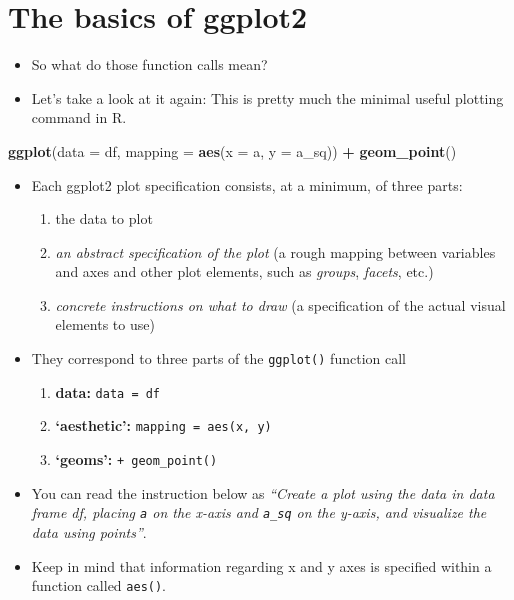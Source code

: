 \documentclass[
]{book}
\newenvironment{Shaded}{\begin{snugshade}}{\end{snugshade}}
\newcommand{\AttributeTok}[1]{\textcolor[rgb]{0.13,0.29,0.53}{#1}}
\newcommand{\FunctionTok}[1]{\textcolor[rgb]{0.13,0.29,0.53}{\textbf{#1}}}
\newcommand{\NormalTok}[1]{#1}
\newcommand{\SpecialCharTok}[1]{\textcolor[rgb]{0.81,0.36,0.00}{\textbf{#1}}}
\providecommand{\tightlist}{%
  \setlength{\itemsep}{0pt}\setlength{\parskip}{0pt}}
\begin{document}
\hypertarget{the-basics-of-ggplot2-1}{%
\section{The basics of ggplot2}\label{the-basics-of-ggplot2-1}}

\begin{itemize}
\item
  So what do those function calls mean?
\item
  Let's take a look at it again: This is pretty much the minimal useful plotting command in R.
\end{itemize}

\begin{Shaded}
\begin{Highlighting}[]
\FunctionTok{ggplot}\NormalTok{(}\AttributeTok{data =}\NormalTok{ df, }\AttributeTok{mapping =} \FunctionTok{aes}\NormalTok{(}\AttributeTok{x =}\NormalTok{ a, }\AttributeTok{y =}\NormalTok{ a\_sq)) }\SpecialCharTok{+} \FunctionTok{geom\_point}\NormalTok{()}
\end{Highlighting}
\end{Shaded}

\begin{itemize}
\tightlist
\item
  Each ggplot2 plot specification consists, at a minimum, of three parts:

  \begin{enumerate}
  \def\labelenumi{\arabic{enumi}.}
  \tightlist
  \item
    {the data to plot}
  \item
    {\emph{an abstract specification of the plot} (a rough mapping between variables and axes and other plot elements, such as \emph{groups}, \emph{facets}, etc.)}
  \item
    {\emph{concrete instructions on what to draw} (a specification of the actual visual elements to use)}
  \end{enumerate}
\item
  They correspond to three parts of the \texttt{ggplot()} function call

  \begin{enumerate}
  \def\labelenumi{\arabic{enumi}.}
  \tightlist
  \item
    {\textbf{data:} \texttt{data\ =\ df}}
  \item
    {\textbf{`aesthetic':} \texttt{mapping\ =\ aes(x,\ y)}}
  \item
    {\textbf{`geoms':} \texttt{+\ geom\_point()}}
  \end{enumerate}
\item
  You can read the instruction below as \emph{``Create a plot {using the data in data frame df}, {placing \texttt{a} on the x-axis and \texttt{a\_sq} on the y-axis}, {and visualize the data using points}''}.
\item
  Keep in mind that information regarding x and y axes is specified within a function called \texttt{aes()}.
\end{itemize}
\end{document}
